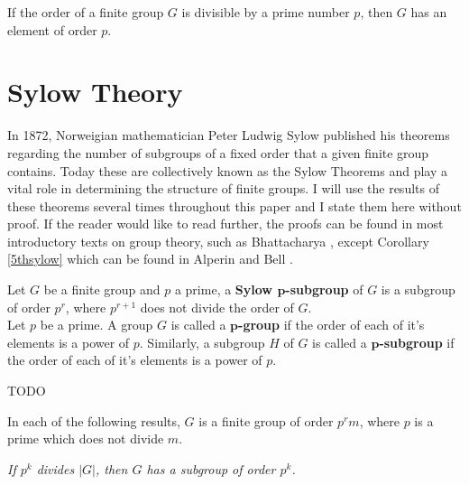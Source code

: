 \vspace{-10mm}

\begin{theorem}
    \label{cauchy} If the order of a finite group $G$ is divisible by a prime number $p$, then $G$ has an element of order $p$. \\
\end{theorem} 

\section{Sylow Theory}

In 1872, Norweigian mathematician Peter Ludwig Sylow published his theorems regarding the number of subgroups of a fixed order that a given finite group contains. Today these are collectively known as the Sylow Theorems and play a vital role in determining the structure of finite groups. I will use the results of these theorems several times throughout this paper and I state them here without proof. If the reader would like to read further, the proofs can be found in most introductory texts on group theory, such as Bhattacharya \cite{bhattacharya}, except Corollary \ref{5thsylow} which can be found in Alperin and Bell \cite[p.64]{alperin} . \\


\begin{definition}
Let $G$ be a finite group and $p$ a prime, a \textbf{Sylow $\pmb{p}$-subgroup} of $G$ is a subgroup of order $p^r$, where $p^{r+1}$ does not divide the order of $G$. \\

Let $p$ be a prime. A group $G$ is called a \textbf{$\pmb{p}$-group} if the order of each of it's elements is a power of $p$. Similarly, a subgroup $H$ of $G$ is called a \textbf{$\pmb{p}$-subgroup} if the order of each of it's elements is a power of $p$.
\end{definition}

\begin{remark}
    TODO
\end{remark}

In each of the following results, $G$ is a finite group of order $p^r m$, where $p$ is a prime which does not divide $m$. \\


\begin{theorem}
    \label{Sylow.exists_subgroup_card_pow_prime}
\textit{If $p^k$ divides $|G|$, then $G$ has a subgroup of order $p^k$.} \\

\end{theorem}

